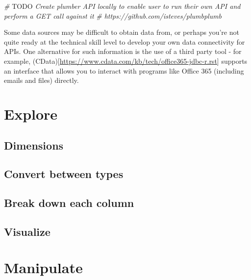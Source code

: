 \documentclass[
]{book}
\newenvironment{Shaded}{\begin{snugshade}}{\end{snugshade}}
\newcommand{\AlertTok}[1]{\textcolor[rgb]{0.94,0.16,0.16}{#1}}
\newcommand{\CommentTok}[1]{\textcolor[rgb]{0.56,0.35,0.01}{\textit{#1}}}
\begin{document}
\begin{Shaded}
\begin{Highlighting}[]
\CommentTok{# }\AlertTok{TODO}\CommentTok{ Create plumber API locally to enable user to run their own API and perform a GET call against it}
\CommentTok{# https://github.com/isteves/plumbplumb}
\end{Highlighting}
\end{Shaded}

Some data sources may be difficult to obtain data from, or perhaps you're not quite ready at the technical skill level to develop your own data connectivity for APIs. One alternative for such information is the use of a third party tool - for example, (CData){[}\url{https://www.cdata.com/kb/tech/office365-jdbc-r.rst}{]} supports an interface that allows you to interact with programs like Office 365 (including emails and files) directly.

\hypertarget{explore}{%
\chapter{Explore}\label{explore}}

\hypertarget{dimensions}{%
\section{Dimensions}\label{dimensions}}

\hypertarget{convert-between-types}{%
\section{Convert between types}\label{convert-between-types}}

\hypertarget{break-down-each-column}{%
\section{Break down each column}\label{break-down-each-column}}

\hypertarget{visualize}{%
\section{Visualize}\label{visualize}}

\hypertarget{manipulate}{%
\chapter{Manipulate}\label{manipulate}}
\end{document}
